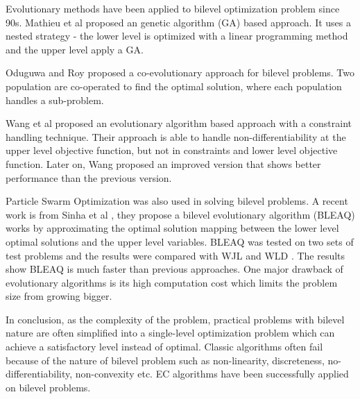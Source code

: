 Evolutionary methods have been applied to bilevel optimization problem since 90s. Mathieu et al \cite{Mathieu:2011dw} proposed an genetic algorithm (GA) based approach. It uses a nested strategy - the lower level is optimized with a linear programming method and the upper level apply a GA.

Oduguwa and Roy \cite{Oduguwa:2002kr} proposed a co-evolutionary approach for bilevel problems. Two population are co-operated to find the optimal solution, where each population handles a sub-problem. 

Wang et al \cite{Wang:2005fa} proposed an evolutionary algorithm based approach with a constraint handling technique.  Their approach is able to handle non-differentiability at the upper level objective function, but not in constraints and lower  level objective function. Later on, Wang proposed an improved version \cite{Wang:2011di} that shows better performance than the previous version.

Particle Swarm Optimization \cite{Li:2006br} was also used in solving bilevel problems.
A recent work is from Sinha et al \cite{Sinha:2013tn}, they propose a bilevel evolutionary algorithm (BLEAQ) works by approximating the optimal solution mapping between the lower level optimal solutions and the upper level variables.  BLEAQ was tested on two sets of test problems and the results were compared with WJL \cite{Wang:2005fa} and WLD \cite{Wang:2011di}. The results show BLEAQ is much faster than previous approaches.
One major drawback of evolutionary algorithms is its high computation cost which limits the problem size from growing bigger.

In conclusion, as the complexity of the problem, practical problems with bilevel nature are often simplified into a single-level optimization problem which can achieve a satisfactory level instead of optimal. Classic algorithms often fail because of the nature of bilevel problem such as non-linearity, discreteness, no-differentiability, non-convexity etc. EC algorithms have been successfully applied on bilevel problems.





